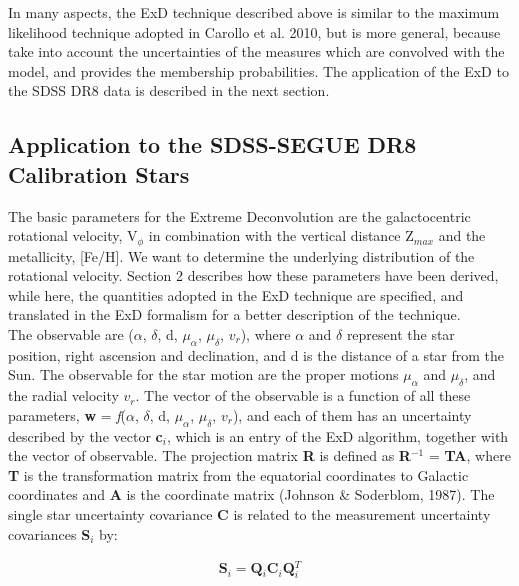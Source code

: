 \documentclass[apj]{emulateapj}
\begin{document}
In many aspects, the ExD technique described above is similar to the maximum likelihood technique adopted in Carollo et al. 2010, but is more general, because take into account the uncertainties of the measures which are convolved with the model, and provides the membership probabilities. The application of the ExD to the SDSS DR8 data is described in the next section.

\subsection{Application to the SDSS-SEGUE DR8 Calibration Stars}

The basic parameters for the Extreme Deconvolution are the galactocentric rotational velocity, V$_{\phi}$ in combination with the vertical distance Z$_{max}$ and the metallicity, [Fe/H]. We want to determine the underlying distribution of the rotational velocity. Section 2 describes how these parameters have been derived, while here, the quantities adopted in the ExD technique are specified, and translated in the ExD formalism for a better description of the technique.\\
The observable are ($\alpha$, $\delta$, d, $\mu_{\alpha}$, $\mu_{\delta}$, $v_{r}$), where $\alpha$ and $\delta$ represent the star position, right ascension and declination, and d is the distance of a star from the Sun. The observable for the star motion are the proper motions $\mu_{\alpha}$ and $\mu_{\delta}$, and the radial velocity $v_{r}$. The vector of the observable is a function of all these parameters, \textbf{w} = \emph{f}($\alpha$, $\delta$, d, $\mu_{\alpha}$, $\mu_{\delta}$, $v_{r}$), and each of them has an uncertainty described by the vector \textbf{c$_{i}$}, which is an entry of the ExD algorithm, together with the vector of observable. The projection matrix \textbf{R} is defined as \textbf{R}$^{-1}$ = \textbf{T}\textbf{A}, where \textbf{T} is the transformation matrix from the equatorial coordinates to Galactic coordinates and \textbf{A} is the coordinate matrix (Johnson \& Soderblom, 1987). The single star uncertainty covariance \textbf{C} is related to the measurement uncertainty covariances \textbf{S$_{i}$} by:

\begin{eqnarray}
\textbf{S$_{i}$} = \textbf{Q$_{i}$}\textbf{C$_{i}$}\textbf{Q$_{i}^{T}$}
\end{eqnarray}
\end{document}
